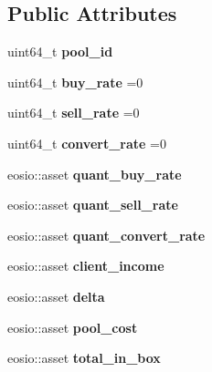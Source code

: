 \subsection*{Public Attributes}
\begin{DoxyCompactItemize}
\item 
\mbox{\label{structrate_a2b87f5a0629a455443d784ccbf84287c}} 
uint64\+\_\+t {\bfseries pool\+\_\+id}
\item 
\mbox{\label{structrate_a2267ea65cd8990c87426ba3091e95e85}} 
uint64\+\_\+t {\bfseries buy\+\_\+rate} =0
\item 
\mbox{\label{structrate_a6e21a3a6d869ec8b87c54cb4ee2ad375}} 
uint64\+\_\+t {\bfseries sell\+\_\+rate} =0
\item 
\mbox{\label{structrate_ac9f9ea66d77c2cec08b1f5f8676c58c1}} 
uint64\+\_\+t {\bfseries convert\+\_\+rate} =0
\item 
\mbox{\label{structrate_a46bc251e2c71cfc2258505fe2461c7e4}} 
eosio\+::asset {\bfseries quant\+\_\+buy\+\_\+rate}
\item 
\mbox{\label{structrate_a5bf20ca9d09de3efc8a583a2235ef58c}} 
eosio\+::asset {\bfseries quant\+\_\+sell\+\_\+rate}
\item 
\mbox{\label{structrate_a4bd943c561ccabc0db2e90019f2120c7}} 
eosio\+::asset {\bfseries quant\+\_\+convert\+\_\+rate}
\item 
\mbox{\label{structrate_ae062e16cbc4a957633c87db9481d4e57}} 
eosio\+::asset {\bfseries client\+\_\+income}
\item 
\mbox{\label{structrate_a577cd2278a61dda70efc479e6bfdd702}} 
eosio\+::asset {\bfseries delta}
\item 
\mbox{\label{structrate_a71141faf60e9e01b298330ac9ee566b7}} 
eosio\+::asset {\bfseries pool\+\_\+cost}
\item 
\mbox{\label{structrate_afbbb65641251ea5537628c007a5412a1}} 
eosio\+::asset {\bfseries total\+\_\+in\+\_\+box}
\item 

\end{DoxyCompactItemize}
